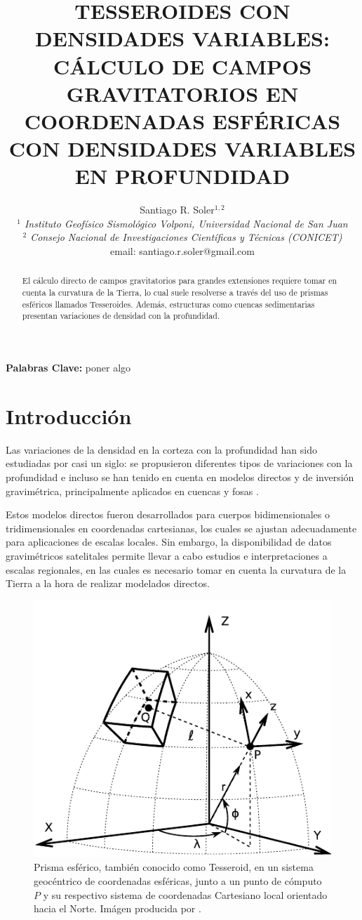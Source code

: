 \documentclass[a4paper,10pt]{article}
\title{
    \textbf{
    TESSEROIDES CON DENSIDADES VARIABLES:
    CÁLCULO DE CAMPOS GRAVITATORIOS EN COORDENADAS ESFÉRICAS CON
    DENSIDADES VARIABLES EN PROFUNDIDAD
    }
}
\author{
    Santiago R. Soler$^{1,2}$ \vspace{0.5em} \\ 
    \textit{$^1$ Instituto Geofísico Sismológico Volponi, Universidad Nacional de San Juan} \\
    \textit{$^2$ Consejo Nacional de Investigaciones Científicas y Técnicas (CONICET)} \vspace{0.4em} \\
    email: santiago.r.soler@gmail.com
}
\date{}
\begin{document}
\maketitle

\vspace{-2.5em}
\begin{center}
\textbf{Palabras Clave:} poner algo
\end{center}
\vspace{0.5em}

\begin{abstract}
El cálculo directo de campos gravitatorios para grandes extensiones requiere tomar en cuenta la curvatura de la Tierra, lo cual suele resolverse a través del uso de prismas esféricos llamados Tesseroides. Además, estructuras como cuencas sedimentarias presentan variaciones de densidad con la profundidad.

\end{abstract}


\section{Introducción}

Las variaciones de la densidad en la corteza con la profundidad han sido estudiadas por casi un siglo: se propusieron diferentes tipos de variaciones con la profundidad \citep{Athy1930, Maxant1980, Rao1986, Rao1993, Rao1994} e incluso se han tenido en cuenta en modelos directos y de inversión gravimétrica, principalmente aplicados en cuencas y fosas \citep{Cordell1973, Rao1986, Cowie1990, Rao1993, Rao1994, Zhang2001, Welford2010}.

Estos modelos directos fueron desarrollados para cuerpos bidimensionales o tridimensionales en coordenadas cartesianas, los cuales se ajustan adecuadamente para aplicaciones de escalas locales.
Sin embargo, la disponibilidad de datos gravimétricos satelitales permite llevar a cabo estudios e interpretaciones a escalas regionales, en las cuales es necesario tomar en cuenta la curvatura de la Tierra a la hora de realizar modelados directos. 

\begin{figure}
\centering
\includegraphics[width=0.4\linewidth]{../manuscript/figures/tesseroid-uieda.pdf}
\caption{
Prisma esférico, también conocido como Tesseroid, en un sistema geocéntrico de coordenadas esféricas, junto a un punto de cómputo $P$ y su respectivo sistema de coordenadas Cartesiano local orientado hacia el Norte. Imágen producida por \citet{Uieda2015}.
}
\label{fig:tesseroid-uieda}
\end{figure}
\end{document}
